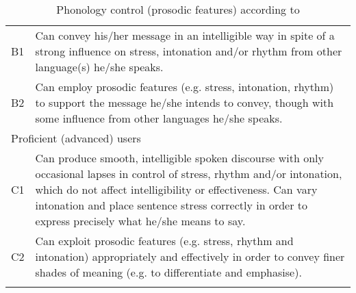 \begin{table}
	\caption{Phonology control (prosodic features) according to \citealt{CEFR2018}}
	\label{tab:2.3b}
	\begin{tabularx}{\textwidth}{lX}
		\lsptoprule
		\multicolumn{2}{l}{{Independent (intermediate) users}}\\\midrule
		B1 & Can convey his/her message in an intelligible way in spite of a strong influence on stress, intonation and/or rhythm from other language(s) he/she speaks.\\
		B2 & Can employ prosodic features (e.g. stress, intonation, rhythm) to support the message he/she intends to convey, though with some influence from other languages he/she speaks.\\\midrule
		\multicolumn{2}{l}{{Proficient (advanced) users}}\\\midrule
		C1 & Can produce smooth, intelligible spoken discourse with only occasional lapses in control of stress, rhythm and/or intonation, which do not affect intelligibility or effectiveness. Can vary intonation and place sentence stress correctly in order to express precisely what he/she means to say.\\
		C2 & Can exploit prosodic features (e.g. stress, rhythm and intonation) appropriately and effectively in order to convey finer shades of meaning (e.g. to differentiate and emphasise). \\
		\lspbottomrule
	\end{tabularx}
\end{table}

